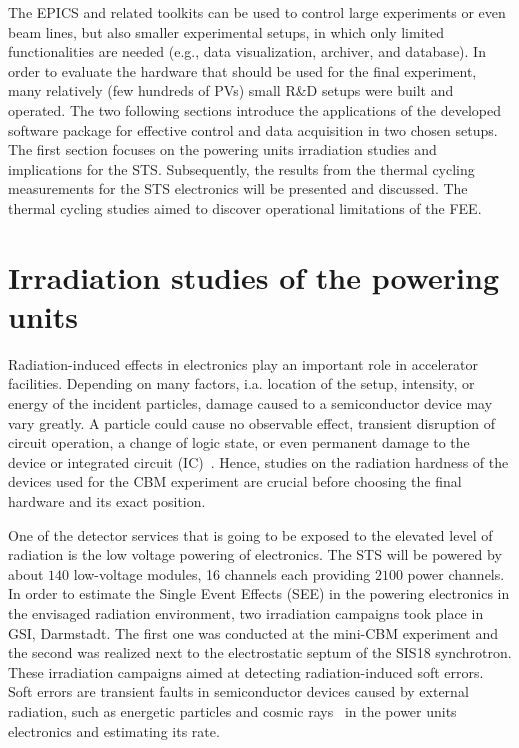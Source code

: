 The \gls{EPICS} and related toolkits can be used to control large experiments or even beam lines, but also smaller experimental setups, in which only limited functionalities are needed (e.g., data visualization, archiver, and database). In order to evaluate the hardware that should be used for the final experiment, many relatively (few hundreds of \glspl{PV}) small R\&D setups were built and operated. %
The two following sections introduce the applications of the developed software package for effective control and data acquisition in two chosen setups. The first section focuses on the powering units irradiation studies and implications for the \gls{STS}. Subsequently, the results from the thermal cycling measurements for the \gls{STS} electronics will be presented and discussed. The thermal cycling studies aimed to discover operational limitations of the \gls{FEE}. 


\section{Irradiation studies of the powering units}

Radiation-induced effects in electronics play an important role in accelerator facilities. Depending on many factors, i.a. location of the setup, intensity, or energy of the incident particles, damage caused to a semiconductor device may vary greatly. A particle could cause no observable effect, transient disruption of circuit operation, a change of logic state, or even permanent damage to the device or integrated circuit (IC)~\cite{dodd}. Hence, studies on the radiation hardness of the devices used for the \gls{CBM} experiment are crucial before choosing the final hardware and its exact position.

One of the detector services that is going to be exposed to the elevated level of radiation is the low voltage powering of electronics. The \gls{STS} will be powered by about $140$ low-voltage modules, 16 
channels each providing $2100$ power channels. In order to estimate the Single Event Effects (\gls{SEE}) in the powering electronics in the envisaged radiation environment, two irradiation campaigns took place in \gls{GSI}, Darmstadt.  The first one was conducted at the mini-CBM experiment and the second was realized next to the electrostatic septum of the SIS18 synchrotron. These irradiation campaigns aimed at detecting radiation-induced soft errors. Soft errors are transient faults in semiconductor devices caused by external radiation, such as energetic particles and cosmic rays~\cite{6338321} in the power units electronics and estimating its rate. 

